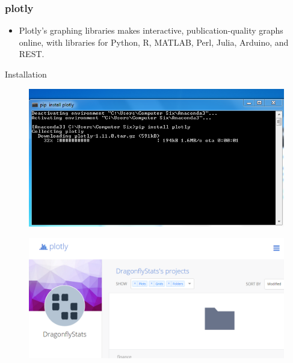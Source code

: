 \documentclass{beamer}
\begin{document}
\begin{frame}
\frametitle{plotly}
\large	
\begin{itemize}
	\item Plotly's graphing libraries makes interactive, publication-quality graphs online, with libraries for Python, R, MATLAB, Perl, Julia, Arduino, and REST.
\end{itemize}
\end{frame}

\begin{frame}
Installation
	\begin{figure}
\centering
\includegraphics[width=1.1\linewidth]{pipinstallplotly}

\end{figure}

\end{frame}
\begin{frame}
	\begin{figure}
\centering
\includegraphics[width=01.1\linewidth]{plotlyprofile}
\end{figure}

\end{frame}
\end{document}
